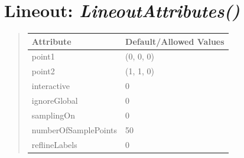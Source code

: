 \documentclass[letterpaper,10pt,english]{sphinxmanual}
\begin{document}
\begin{DUlineblock}{0em}
\item[] 
\end{DUlineblock}

\begin{DUlineblock}{0em}
\item[] 
\end{DUlineblock}


\section{\textbf{Lineout}: \emph{LineoutAttributes()}}
\label{attributes:lineout-lineoutattributes}
\begin{DUlineblock}{0em}
\item[] 
\end{DUlineblock}
\begin{quote}

\begin{tabulary}{\linewidth}{|L|L|}
\hline

\textbf{Attribute}
 & 
\textbf{Default/Allowed Values}
\\
\hline
point1
 & 
(0, 0, 0)
\\
\hline
point2
 & 
(1, 1, 0)
\\
\hline
interactive
 & 
0
\\
\hline
ignoreGlobal
 & 
0
\\
\hline
samplingOn
 & 
0
\\
\hline
numberOfSamplePoints
 & 
50
\\
\hline
reflineLabels
 & 
0
\\
\hline\end{tabulary}

\end{quote}

\begin{DUlineblock}{0em}
\item[] 
\end{DUlineblock}

\begin{DUlineblock}{0em}
\item[] 
\end{DUlineblock}
\end{document}
